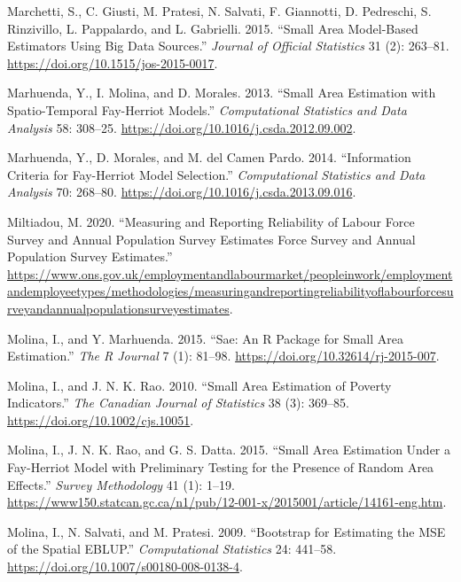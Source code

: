 \begin{CSLReferences}{1}{0}
\leavevmode{}%
Marchetti, S., C. Giusti, M. Pratesi, N. Salvati, F. Giannotti, D. Pedreschi, S. Rinzivillo, L. Pappalardo, and L. Gabrielli. 2015. {``Small Area Model-Based Estimators Using Big Data Sources.''} \emph{Journal of Official Statistics} 31 (2): 263--81. \url{https://doi.org/10.1515/jos-2015-0017}.

\leavevmode{}%
Marhuenda, Y., I. Molina, and D. Morales. 2013. {``Small Area Estimation with Spatio-Temporal {Fay-Herriot} Models.''} \emph{Computational Statistics and Data Analysis} 58: 308--25. \url{https://doi.org/10.1016/j.csda.2012.09.002}.

\leavevmode{}%
Marhuenda, Y., D. Morales, and M. del Camen Pardo. 2014. {``Information Criteria for {Fay-Herriot} Model Selection.''} \emph{Computational Statistics and Data Analysis} 70: 268--80. \url{https://doi.org/10.1016/j.csda.2013.09.016}.

\leavevmode{}%
Miltiadou, M. 2020. {``Measuring and Reporting Reliability of Labour Force Survey and Annual Population Survey Estimates Force Survey and Annual Population Survey Estimates.''} \url{https://www.ons.gov.uk/employmentandlabourmarket/peopleinwork/employmentandemployeetypes/methodologies/measuringandreportingreliabilityoflabourforcesurveyandannualpopulationsurveyestimates}.

\leavevmode{}%
Molina, I., and Y. Marhuenda. 2015. {``Sae: An {R} Package for Small Area Estimation.''} \emph{The R Journal} 7 (1): 81--98. \url{https://doi.org/10.32614/rj-2015-007}.

\leavevmode{}%
Molina, I., and J. N. K. Rao. 2010. {``Small Area Estimation of Poverty Indicators.''} \emph{The Canadian Journal of Statistics} 38 (3): 369--85. \url{https://doi.org/10.1002/cjs.10051}.

\leavevmode{}%
Molina, I., J. N. K. Rao, and G. S. Datta. 2015. {``Small Area Estimation Under a {Fay-Herriot} Model with Preliminary Testing for the Presence of Random Area Effects.''} \emph{Survey Methodology} 41 (1): 1--19. \url{https://www150.statcan.gc.ca/n1/pub/12-001-x/2015001/article/14161-eng.htm}.

\leavevmode{}%
Molina, I., N. Salvati, and M. Pratesi. 2009. {``Bootstrap for Estimating the MSE of the Spatial EBLUP.''} \emph{Computational Statistics} 24: 441--58. \url{https://doi.org/10.1007/s00180-008-0138-4}.


\end{CSLReferences}
